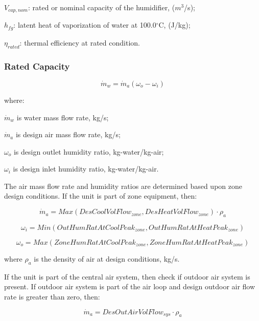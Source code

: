 \(V_{cap,nom}\): rated or nominal capacity of the humidifier, (\(m^{3}\)/s);

\(h_{fg}\): latent heat of vaporization of water at 100.0\(^{\circ}\)C, (J/kg);

\(\eta_{rated}\): thermal efficiency at rated condition.

\subsubsection{Rated Capacity}\label{rated-capacity}

\begin{equation}
{\dot m_w} = {\dot m_a}\left( {{\omega_o} - {\omega_i}} \right)
\end{equation}

where:

\({\dot m_w}\) is water mass flow rate, kg/s;

\({\dot m_a}\) is design air mass flow rate, kg/s;

\(\omega_{o}\) is design outlet humidity ratio, kg-water/kg-air;

\(\omega_{i}\) is design inlet humidity ratio, kg-water/kg-air.

The air mass flow rate and humidity ratios are determined based upon zone design conditions. If the unit is part of zone equipment, then:

\begin{equation}
{\dot m_a} = Max\left( {DesCoolVolFlo{w_{zone}},DesHeatVolFlo{w_{zone}}} \right) \cdot {\rho_a}
\end{equation}

\begin{equation}
{\omega_i} = Min\left( {OutHumRatAtCoolPea{k_{zone}},OutHumRatAtHeatPea{k_{zone}}} \right)
\end{equation}

\begin{equation}
  {\omega_o} = Max\left( {ZoneHumRatAtCoolPea{k_{zone}},ZoneHumRatAtHeatPea{k_{zone}}} \right)
\end{equation}

where \(\rho_{a}\) is the density of air at design conditions, kg/s.

If the unit is part of the central air system, then check if outdoor air system is present. If outdoor air system is part of the air loop and design outdoor air flow rate is greater than zero, then:

\begin{equation}
{\dot m_a} = DesOutAirVolFlo{w_{sys}} \cdot {\rho_a}
\end{equation}

